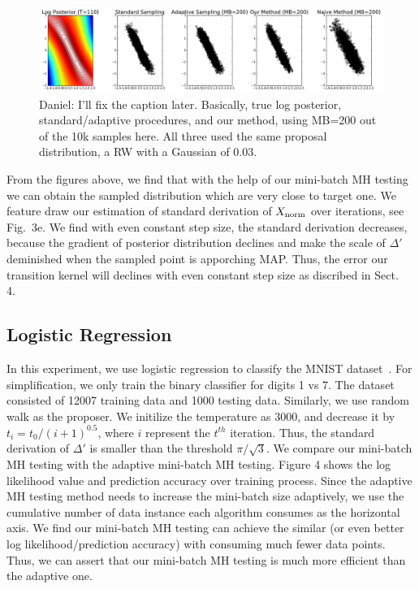 \documentclass{article}
\begin{document}
\begin{figure}[t]
    \centering
    \includegraphics[width=1\linewidth]{cloud_v01.png}
    \caption{
    {\color{blue}
    Daniel: I'll fix the caption later. Basically, true log posterior, standard/adaptive procedures,
    and our method, using MB=200 out of the 10k samples here. All three used the same proposal
    distribution, a RW with a Gaussian of 0.03.
    }
    }
\end{figure}

From the figures above, we find that with the help of our mini-batch MH testing we can obtain the
sampled distribution which are very close to target one. We feature draw our estimation of standard
derivation of $X_{\rm norm}$ over iterations, see Fig.~3e. We find with even constant step size, the
standard derivation decreases, because the gradient of posterior distribution declines and make the
scale of $\Delta'$ deminished when the sampled point is apporching MAP. Thus, the error our
transition kernel will declines with even constant step size as discribed in Sect.~ 4.

\subsection{Logistic Regression}\label{ssec:logistic}

In this experiment, we use logistic regression to classify the MNIST
dataset~\cite{lecun-mnisthandwrittendigit-2010}. For simplification, we only train the binary
classifier for digits 1 vs 7. The dataset consisted of 12007 training data and 1000 testing data.
Similarly, we use random walk as the proposer. We initilize the temperature as 3000, and decrease it by $t_i = t_0 / (i + 1)^{0.5}$, where $i$ represent the $t^{th}$ iteration. Thus, the standard derivation of $\Delta'$ is smaller than the threshold $\pi/\sqrt{3}$.  We compare our mini-batch MH testing with the
adaptive mini-batch MH testing. Figure 4 shows the log likelihood value and prediction accuracy over
training process. Since the adaptive MH testing method needs to increase the mini-batch size
adaptively, we use the cumulative number of data instance each algorithm consumes as the horizontal
axis. We find our mini-batch MH testing can achieve the similar (or even better log
likelihood/prediction accuracy) with consuming much fewer data points. Thus, we can assert that our
mini-batch MH testing is much more efficient than the adaptive one. 
\end{document}
